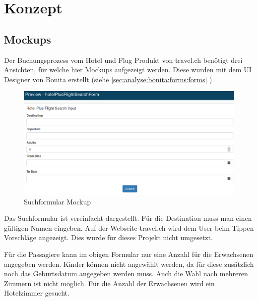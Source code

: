 
\chapter{Konzept}
\label{sec:konzept}

\section{Mockups}
Der Buchungsprozess vom Hotel und Flug Produkt von travel.ch benötigt drei Ansichten, für welche hier Mockups aufgezeigt werden.
Diese wurden mit dem UI Designer von Bonita erstellt (siehe \cref{sec:analyse:bonita:forms:forms} ).

\begin{figure}[H]
	\centering
	\includegraphics[width=1\textwidth]{images/forms-search.png}
	\caption{Suchformular Mockup}
	\label{fig:konzept:mockups:search}
\end{figure}

Das Suchformular ist vereinfacht dargestellt. Für die Destination muss man einen gültigen Namen eingeben. Auf der Webseite travel.ch wird dem User beim Tippen Vorschläge angezeigt. Dies wurde für dieses Projekt nicht umgesetzt.

Für die Passagiere kann im obigen Formular nur eine Anzahl für die Erwachsenen angegeben werden. Kinder können nicht angewählt werden, da für diese zusätzlich noch das Geburtsdatum angegeben werden muss. Auch die Wahl nach mehreren Zimmern ist nicht möglich. Für die Anzahl der Erwachsenen wird ein Hotelzimmer gesucht.

